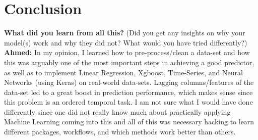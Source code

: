 \documentclass{article}
\begin{document}
\section{Conclusion}
\textbf{What did you learn from all this?}
(Did you get any insights on why your model(s) work and why they did not? What would you have tried differently?)\newline\newline
\textbf{Ahmed:} \newline
In my opinion, I learned how to pre-process/clean a data-set and how this was arguably one of the most important steps in achieving a good predictor, as well as to implement Linear Regression, Xgboost, Time-Series, and Neural Networks (using Keras) on real-world data-sets. Lagging columns/features of the data-set led to a great boost in prediction performance, which makes sense since this problem is an ordered temporal task.\newline
I am not sure what I would have done differently since one did not really know much about practically applying Machine Learning coming into this and all of this was necessary hacking to learn different packages, workflows, and which methods work better than others.



\end{document}
